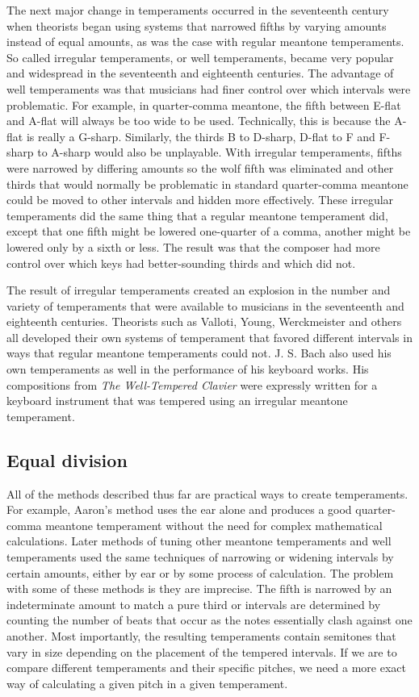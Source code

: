 The next major change in temperaments occurred in the seventeenth century when theorists
began using systems that narrowed fifths by varying amounts instead of equal amounts, as
was the case with regular meantone temperaments.  So called irregular temperaments, or
well temperaments, became very popular and widespread in the seventeenth and eighteenth
centuries.  The advantage of well temperaments was that musicians had finer control over
which intervals were problematic.  For example, in quarter-comma meantone, the fifth
between E-flat and A-flat will always be too wide to be used.  Technically, this is
because the A-flat is really a G-sharp. \autocite[35]{RD:1}  Similarly, the thirds B to
D-sharp, D-flat to F and F-sharp to A-sharp would also be unplayable.  With irregular
temperaments, fifths were narrowed by differing amounts so the wolf fifth was eliminated
and other thirds that would normally be problematic in standard quarter-comma meantone
could be moved to other intervals and hidden more effectively. These irregular
temperaments did the same thing that a regular meantone temperament did, except that one
fifth might be lowered one-quarter of a comma, another might be lowered only by a sixth or
less.  The result was that the composer had more control over which keys had
better-sounding thirds and which did not.

The result of irregular temperaments created an explosion in the number and variety of
temperaments that were available to musicians in the seventeenth and eighteenth centuries.
Theorists such as Valloti, Young, Werckmeister and others all developed their own systems
of temperament that favored different intervals in ways that regular meantone temperaments
could not.  J. S. Bach also used his own temperaments as well in the performance of his
keyboard works.  His compositions from \textit{The Well-Tempered Clavier} were expressly
written for a keyboard instrument that was tempered using an irregular meantone
temperament.

\subsection{Equal division}

All of the methods described thus far are practical ways to create temperaments.
For example, Aaron's method uses the ear alone and produces a good quarter-comma 
meantone temperament without the need for complex mathematical calculations. Later methods
of tuning other meantone temperaments and well temperaments used the same techniques of
narrowing or widening intervals by certain amounts, either by ear or by some process of
calculation. The problem with some of these methods is they are imprecise. The
fifth is narrowed by an indeterminate amount to match a pure third or
intervals are determined by counting the number of beats that occur as the notes
essentially clash against one another.  Most importantly, the resulting temperaments
contain semitones that vary in size depending on the placement of the tempered intervals.
If we are to compare different temperaments and their specific pitches, we need a more
exact way of calculating a given pitch in a given temperament.

